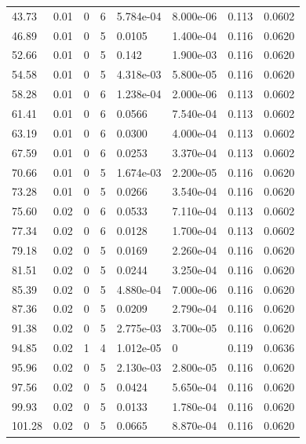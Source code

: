 \documentclass[preview]{standalone}
\begin{document}
{{\begin{tabular}{L{1.2cm}C{1.2cm} C{0.3cm}C{0.5cm} C{1.4cm}C{1.4cm} C{1.4cm}C{1.4cm}}
  43.73  &  0.01  & 0     &  6 &  5.784e-04  & 8.000e-06  & 0.113 &  0.0602   \\ 
  46.89  &  0.01  & 0     &  5 &  0.0105  & 1.400e-04  & 0.116 &  0.0620   \\ 
  52.66  &  0.01  & 0     &  5 &  0.142  & 1.900e-03  & 0.116 &  0.0620   \\ 
  54.58  &  0.01  & 0     &  5 &  4.318e-03  & 5.800e-05  & 0.116 &  0.0620   \\ 
  58.28  &  0.01  & 0     &  6 &  1.238e-04  & 2.000e-06  & 0.113 &  0.0602   \\ 
  61.41  &  0.01  & 0     &  6 &  0.0566  & 7.540e-04  & 0.113 &  0.0602   \\ 
  63.19  &  0.01  & 0     &  6 &  0.0300  & 4.000e-04  & 0.113 &  0.0602   \\ 
  67.59  &  0.01  & 0     &  6 &  0.0253  & 3.370e-04  & 0.113 &  0.0602   \\ 
  70.66  &  0.01  & 0     &  5 &  1.674e-03  & 2.200e-05  & 0.116 &  0.0620   \\ 
  73.28  &  0.01  & 0     &  5 &  0.0266  & 3.540e-04  & 0.116 &  0.0620   \\ 
  75.60  &  0.02  & 0     &  6 &  0.0533  & 7.110e-04  & 0.113 &  0.0602   \\ 
  77.34  &  0.02  & 0     &  6 &  0.0128  & 1.700e-04  & 0.113 &  0.0602   \\ 
  79.18  &  0.02  & 0     &  5 &  0.0169  & 2.260e-04  & 0.116 &  0.0620   \\ 
  81.51  &  0.02  & 0     &  5 &  0.0244  & 3.250e-04  & 0.116 &  0.0620   \\ 
  85.39  &  0.02  & 0     &  5 &  4.880e-04  & 7.000e-06  & 0.116 &  0.0620   \\ 
  87.36  &  0.02  & 0     &  5 &  0.0209  & 2.790e-04  & 0.116 &  0.0620   \\ 
  91.38  &  0.02  & 0     &  5 &  2.775e-03  & 3.700e-05  & 0.116 &  0.0620   \\ 
  94.85  &  0.02  & 1     &  4 &  1.012e-05  & 0  & 0.119 &  0.0636   \\ 
  95.96  &  0.02  & 0     &  5 &  2.130e-03  & 2.800e-05  & 0.116 &  0.0620   \\ 
  97.56  &  0.02  & 0     &  5 &  0.0424  & 5.650e-04  & 0.116 &  0.0620   \\ 
  99.93  &  0.02  & 0     &  5 &  0.0133  & 1.780e-04  & 0.116 &  0.0620   \\ 
  101.28  &  0.02  & 0     &  5 &  0.0665  & 8.870e-04  & 0.116 &  0.0620   \\ 

\end{tabular}}}
\end{document}
